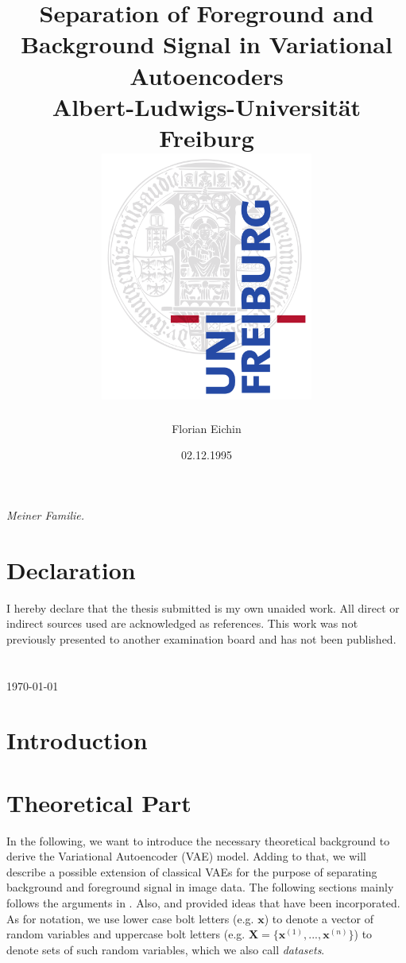 \documentclass[12pt]{report}
\title{
{Separation of Foreground and Background Signal in Variational Autoencoders}\\
{\large Albert-Ludwigs-Universität Freiburg}\\[\baselineskip]
{\includegraphics[width=7cm]{logo.png}}
}
\author{Florian Eichin}
\date{02.12.1995}
\theoremstyle{definition}
\begin{document}
\maketitle


\begin{center}
\vspace*{\fill}
\emph{Meiner Familie.}
\vspace*{\fill}
\end{center}

\chapter*{Declaration}
I hereby declare that the thesis submitted is my own unaided work. All direct or indirect sources used are acknowledged as references. This work was not previously presented to another examination board and has not been published. \\ \\ \\

\today

\tableofcontents

\chapter{Introduction}

\chapter{Theoretical Part}

In the following, we want to introduce the necessary theoretical background to derive the Variational Autoencoder (VAE) model. Adding to that, we will describe a possible extension of classical VAEs for the purpose of separating background and foreground signal in image data.
The following sections mainly follows the arguments in \cite{kingma1}. Also, \cite{kingma2} and \cite{stanford} provided ideas that have been incorporated. As for notation, we use lower case bolt letters (e.g. $\mathbf{x}$) to denote a vector of random variables and uppercase bolt letters (e.g. $\mathbf{X} = \{ \mathbf{x}^{(1)}, ..., \mathbf{x}^{(n)}\}$) to denote sets of such random variables, which we also call \emph{datasets}.
\end{document}
